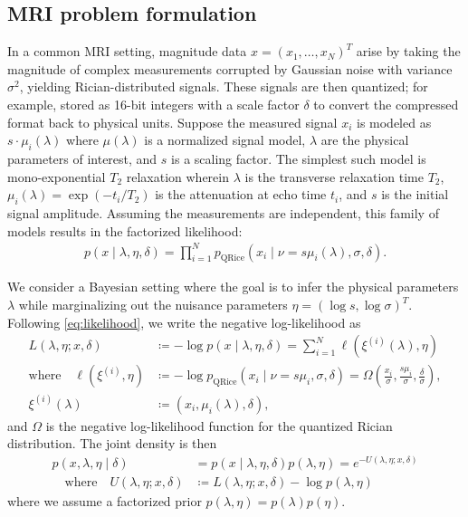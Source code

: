 \documentclass{article}
\begin{document}
\subsection{MRI problem formulation}

In a common MRI setting, magnitude data $x = (x_1, \ldots, x_N)^T$ arise by taking the magnitude of complex measurements corrupted by Gaussian noise with variance $\sigma^2$, yielding Rician-distributed signals.
These signals are then quantized;
for example, stored as 16-bit integers with a scale factor $\delta$ to convert the compressed format back to physical units.
Suppose the measured signal $x_i$ is modeled as $s \cdot \mu_i(\lambda)$ where $\mu(\lambda)$ is a normalized signal model, $\lambda$ are the physical parameters of interest, and $s$ is a scaling factor.
The simplest such model is mono-exponential $T_2$ relaxation wherein $\lambda$ is the transverse relaxation time $T_2$, $\mu_i(\lambda) = \exp(-t_i/T_2)$ is the attenuation at echo time $t_i$, and $s$ is the initial signal amplitude.
Assuming the measurements are independent, this family of models results in the factorized likelihood:
%
\begin{align}\label{eq:likelihood}
  p(x \mid \lambda, \eta, \delta) = \prod_{i=1}^N p_{\mathrm{QRice}}(x_i \mid \nu = s \mu_i(\lambda), \sigma, \delta).
\end{align}

We consider a Bayesian setting where the goal is to infer the physical parameters $\lambda$ while marginalizing out the nuisance parameters $\eta = (\log s, \log \sigma)^T$.
Following \cref{eq:likelihood}, we write the negative log-likelihood as
%
\begin{align}\label{eq:negative-log-likelihood}
  L(\lambda, \eta; x, \delta)              & \coloneqq -\log p(x \mid \lambda, \eta, \delta) = \sum_{i=1}^N \ell(\xi^{(i)}(\lambda), \eta)                                                                      \\
  \text{where} \quad \ell(\xi^{(i)}, \eta) & \coloneqq -\log p_{\mathrm{QRice}}(x_i \mid \nu = s \mu_i, \sigma, \delta) = \Omega\left(\frac{x_i}{\sigma}, \frac{s \mu_i}{\sigma}, \frac{\delta}{\sigma}\right), \\
  \xi^{(i)}(\lambda)                       & \coloneqq (x_i, \mu_i(\lambda), \delta),
\end{align}
%
and $\Omega$ is the negative log-likelihood function for the quantized Rician distribution.
The joint density is then
%
\begin{align}
  p(x, \lambda, \eta \mid \delta) & = p(x \mid \lambda, \eta, \delta) p(\lambda, \eta) = e^{-U(\lambda, \eta; x, \delta)} \\
  \quad \text{where} \quad
  U(\lambda, \eta; x, \delta)     & \coloneqq L(\lambda, \eta; x, \delta) - \log p(\lambda, \eta)
\end{align}
%
where we assume a factorized prior $p(\lambda, \eta) = p(\lambda) p(\eta)$.
\end{document}
